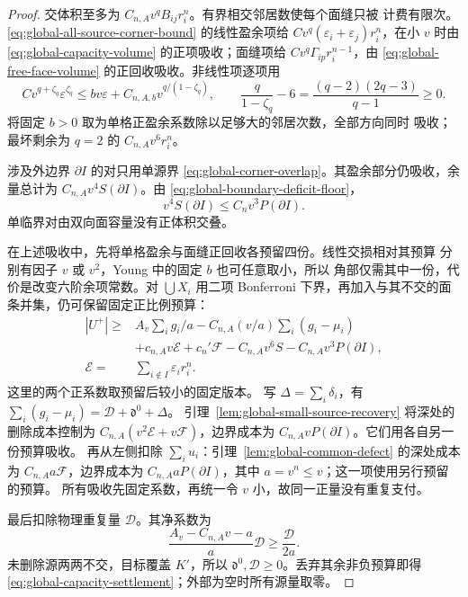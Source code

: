 \begin{proof}
交体积至多为 \(C_{n,A}v^qB_{ij}r_i^n\)。有界相交邻居数使每个面缝只被
计费有限次。\eqref{eq:global-all-source-corner-bound} 的线性盈余项给
\(Cv^q(\varepsilon_i+\varepsilon_j)r_i^n\)，在小 \(v\) 时由
\eqref{eq:global-capacity-volume} 的正项吸收；面缝项给
\(Cv^q\Gamma_{ip}r_i^{n-1}\)，由
\eqref{eq:global-free-face-volume} 的正回收吸收。非线性项逐项用
\[
 Cv^{q+\zeta_q}\varepsilon^{\zeta_q}
 \le bv\varepsilon+C_{n,A,b}v^{q/(1-\zeta_q)},\qquad
 \frac q{1-\zeta_q}-6=\frac{(q-2)(2q-3)}{q-1}\ge0.
\]
将固定 \(b>0\) 取为单格正盈余系数除以足够大的邻居次数，全部方向同时
吸收；最坏剩余为 \(q=2\) 的 \(C_{n,A}v^6r_i^n\)。

涉及外边界 \(\partial I\) 的对只用单源界
\eqref{eq:global-corner-overlap}。其盈余部分仍吸收，余量总计为
\(C_{n,A}v^4S(\partial I)\)。由
\eqref{eq:global-boundary-deficit-floor}，
\begin{equation}\label{eq:global-boundary-angle-price}
 v^4S(\partial I)\le C_nv^3P(\partial I).
\end{equation}
单临界对由双向面容量没有正体积交叠。

在上述吸收中，先将单格盈余与面缝正回收各预留四份。线性交损相对其预算
分别有因子 \(v\) 或 \(v^2\)，Young 中的固定 \(b\) 也可任意取小，所以
角部仅需其中一份，代价是改变六阶余项常数。对 \(\bigcup X_i\) 用二项
Bonferroni 下界，再加入与其不交的面条并集，仍可保留固定正比例预算：
\begin{equation}\label{eq:global-retained-budgets}
 \begin{aligned}
 |U^+|\ge{}&A_v\sum_i g_i/a
 -C_{n,A}(v/a)\sum_i(g_i-\mu_i)\\
 &+c_{n,A}v\mathcal E+c_n'\mathcal F
 -C_{n,A}v^6S-C_{n,A}v^3P(\partial I),\\
 \mathcal E={}&\sum_{i\notin I}\varepsilon_i r_i^n.
 \end{aligned}
\end{equation}
这里的两个正系数取预留后较小的固定版本。
写 \(\Delta=\sum_i\delta_i\)，有
\(\sum_i(g_i-\mu_i)=\mathcal D+\mathfrak d^0+\Delta\)。
引理~\ref{lem:global-small-source-recovery} 将深处的删除成本控制为
\(C_{n,A}(v^2\mathcal E+v\mathcal F)\)，边界成本为
\(C_{n,A}vP(\partial I)\)。它们用各自另一份预算吸收。
再从左侧扣除 \(\sum_i u_i\)：引理~\ref{lem:global-common-defect}
的深处成本为 \(C_{n,A}a\mathcal F\)，边界成本为
\(C_{n,A}aP(\partial I)\)，其中 \(a=v^n\le v\)；这一项使用另行预留的预算。
所有吸收先固定系数，再统一令 \(v\) 小，故同一正量没有重复支付。

最后扣除物理重复量 \(\mathcal D\)。其净系数为
\[
 \frac{A_v-C_{n,A}v-a}{a}\mathcal D\ge\frac{\mathcal D}{2a}.
\]
未删除源两两不交，目标覆盖 \(K'\)，所以
\(\mathfrak d^0,\mathcal D\ge0\)。丢弃其余非负预算即得
\eqref{eq:global-capacity-settlement}；外部为空时所有源量取零。
\end{proof}


